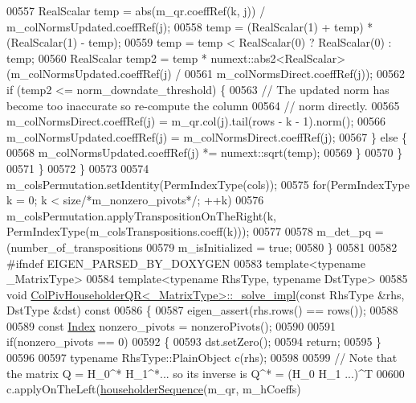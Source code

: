 \begin{DoxyCode}
00557         RealScalar temp = abs(m\_qr.coeffRef(k, j)) / m\_colNormsUpdated.coeffRef(j);
00558         temp = (RealScalar(1) + temp) * (RealScalar(1) - temp);
00559         temp = temp <  RealScalar(0) ? RealScalar(0) : temp;
00560         RealScalar temp2 = temp * numext::abs2<RealScalar>(m\_colNormsUpdated.coeffRef(j) /
00561                                                            m\_colNormsDirect.coeffRef(j));
00562         \textcolor{keywordflow}{if} (temp2 <= norm\_downdate\_threshold) \{
00563           \textcolor{comment}{// The updated norm has become too inaccurate so re-compute the column}
00564           \textcolor{comment}{// norm directly.}
00565           m\_colNormsDirect.coeffRef(j) = m\_qr.col(j).tail(rows - k - 1).norm();
00566           m\_colNormsUpdated.coeffRef(j) = m\_colNormsDirect.coeffRef(j);
00567         \} \textcolor{keywordflow}{else} \{
00568           m\_colNormsUpdated.coeffRef(j) *= numext::sqrt(temp);
00569         \}
00570       \}
00571     \}
00572   \}
00573 
00574   m\_colsPermutation.setIdentity(PermIndexType(cols));
00575   \textcolor{keywordflow}{for}(PermIndexType k = 0; k < size\textcolor{comment}{/*m\_nonzero\_pivots*/}; ++k)
00576     m\_colsPermutation.applyTranspositionOnTheRight(k, PermIndexType(m\_colsTranspositions.coeff(k)));
00577 
00578   m\_det\_pq = (number\_of\_transpositions%
00579   m\_isInitialized = \textcolor{keyword}{true};
00580 \}
00581 
00582 \textcolor{preprocessor}{#ifndef EIGEN\_PARSED\_BY\_DOXYGEN}
00583 \textcolor{keyword}{template}<\textcolor{keyword}{typename} \_MatrixType>
00584 \textcolor{keyword}{template}<\textcolor{keyword}{typename} RhsType, \textcolor{keyword}{typename} DstType>
00585 \textcolor{keywordtype}{void} \hyperlink{group___q_r___module_class_eigen_1_1_col_piv_householder_q_r}{ColPivHouseholderQR<\_MatrixType>::\_solve\_impl}(\textcolor{keyword}{const} 
      RhsType &rhs, DstType &dst)\textcolor{keyword}{ const}
00586 \textcolor{keyword}{}\{
00587   eigen\_assert(rhs.rows() == rows());
00588 
00589   \textcolor{keyword}{const} \hyperlink{namespace_eigen_a62e77e0933482dafde8fe197d9a2cfde}{Index} nonzero\_pivots = nonzeroPivots();
00590 
00591   \textcolor{keywordflow}{if}(nonzero\_pivots == 0)
00592   \{
00593     dst.setZero();
00594     \textcolor{keywordflow}{return};
00595   \}
00596 
00597   \textcolor{keyword}{typename} RhsType::PlainObject c(rhs);
00598 
00599   \textcolor{comment}{// Note that the matrix Q = H\_0^* H\_1^*... so its inverse is Q^* = (H\_0 H\_1 ...)^T}
00600   c.applyOnTheLeft(\hyperlink{group___householder___module_ga4bd4b85120e014cf1125a054b02d4d92}{householderSequence}(m\_qr, m\_hCoeffs)

\end{DoxyCode}
